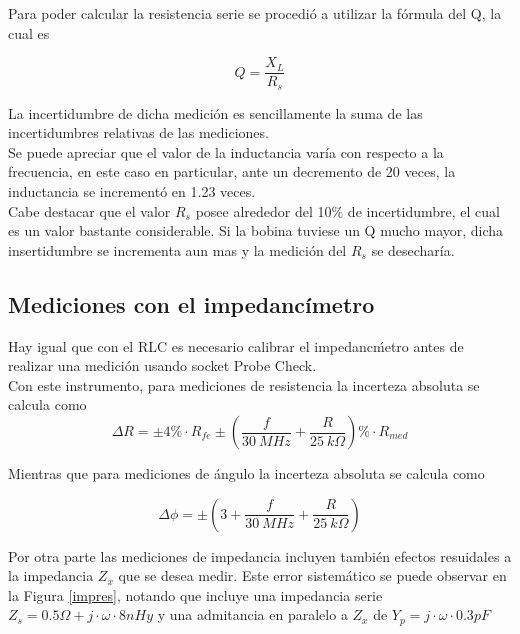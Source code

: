 \documentclass[a4paper,10pt]{article}
\begin{document}
		\indent Para poder calcular la resistencia serie se procedió a utilizar 
		la fórmula del Q, la cual es 

		$$Q = \frac{X_L}{R_s}$$

		\indent La incertidumbre de dicha medición es sencillamente la suma de 
		las incertidumbres relativas de las mediciones. \\
		\indent Se puede apreciar que el valor de la inductancia varía con 
		respecto a la frecuencia, en este caso en particular, ante un decremento
		de 20 veces, la inductancia se incrementó en 1.23 veces. \\
		\indent Cabe destacar que el valor $R_s$ posee alrededor del 10\% de 
		incertidumbre, el cual es un valor bastante considerable. Si la bobina 
		tuviese un Q mucho mayor, dicha insertidumbre se incrementa aun mas y la
		medición del $R_s$ se desecharía. 

	\subsection{Mediciones con el impedanc\'imetro}
		
		\indent Hay igual que con el RLC es necesario calibrar el 
		impedanc\'metro antes de realizar una medici\'on usando socket Probe 
		Check. \\
		\indent Con este instrumento, para mediciones de resistencia la 
		incerteza absoluta se calcula como
		\begin{equation}\label{modulo}
			\Delta R=\pm 4\%\cdot R_{fe}\pm(\frac{f}{30~MHz}+\frac{R}{25~k
			\Omega})\%\cdot R_{med}
		\end{equation}
		
		\indent Mientras que para mediciones de \'angulo la incerteza absoluta 
		se calcula como
		
		\begin{equation}\label{angulo} 
			\Delta\phi=\pm(3+\frac{f}{30~MHz}+\frac{R}{25~k\Omega})
		\end{equation}
		
		\indent Por otra parte las mediciones de impedancia incluyen tambi\'en 
		efectos resuidales a la impedancia $Z_x$ que se desea medir. Este error 
		sistem\'atico se puede observar en la Figura \ref{impres}, notando que 
		incluye una impedancia serie $Z_s=0.5\Omega+j\cdot\omega\cdot8nHy$ y una
		admitancia en paralelo a $Z_x$ de $Y_p=j\cdot\omega\cdot0.3pF$
		
\end{document}
